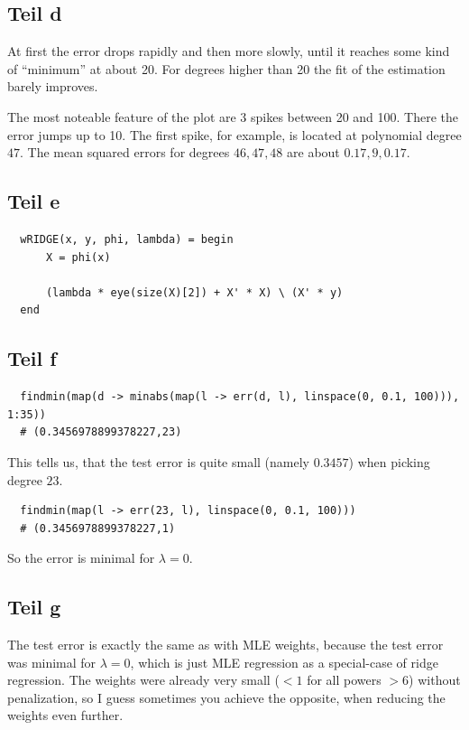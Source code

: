 \documentclass[10pt,a4paper]{article}
\begin{document}
\subsection{Teil d}

At first the error drops rapidly and then more slowly, until it reaches some
kind of ``minimum'' at about 20. For degrees higher than 20 the fit of the
estimation barely improves.

The most noteable feature of the plot are 3 spikes between 20 and 100. There the
error jumps up to 10. The first spike, for example, is located at polynomial
degree $47$. The mean squared errors for degrees $46, 47, 48$ are about
$0.17, 9, 0.17$.

\subsection{Teil e}

\begin{lstlisting}
  wRIDGE(x, y, phi, lambda) = begin
      X = phi(x)

      (lambda * eye(size(X)[2]) + X' * X) \ (X' * y)
  end
\end{lstlisting}

\subsection{Teil f}

\begin{lstlisting}
  findmin(map(d -> minabs(map(l -> err(d, l), linspace(0, 0.1, 100))), 1:35))
  # (0.3456978899378227,23)
\end{lstlisting}
This tells us, that the test error is quite small (namely $0.3457$) when picking degree $23$.

\begin{lstlisting}
  findmin(map(l -> err(23, l), linspace(0, 0.1, 100)))
  # (0.3456978899378227,1)
\end{lstlisting}
So the error is minimal for $\lambda = 0$.

\subsection{Teil g}

The test error is exactly the same as with MLE weights, because the test error
was minimal for $\lambda = 0$, which is just MLE regression as a special-case of
ridge regression. The weights were already very small ($< 1$ for all powers
$> 6$) without penalization, so I guess sometimes you achieve the opposite, when
reducing the weights even further.
\end{document}
